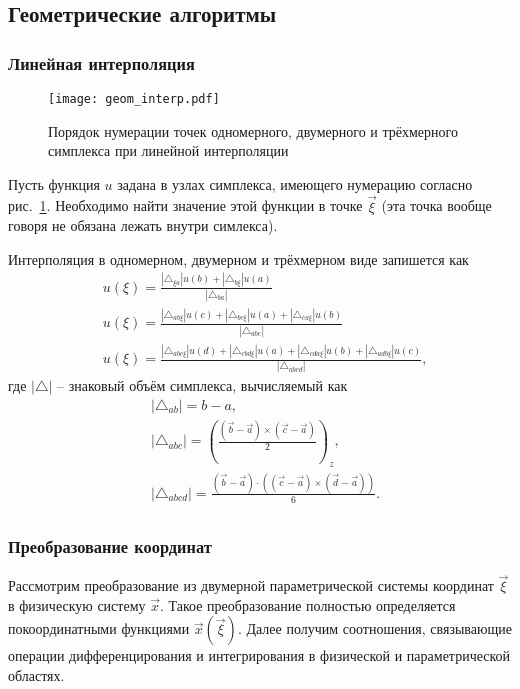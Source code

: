 \subsection{Геометрические алгоритмы}
\subsubsection{Линейная интерполяция}
\begin{figure}[h!]
\centering
\texttt{[image: geom\_interp.pdf]}
\caption{Порядок нумерации точек одномерного, двумерного и трёхмерного симплекса при линейной интерполяции}
\label{fig:geom_interp}
\end{figure}
Пусть функция $u$ задана в узлах симплекса, имеющего нумерацию согласно рис.~\ref{fig:geom_interp}.
Необходимо найти значение этой функции в точке $\vec \xi$ (эта точка вообще говоря не обязана лежать внутри симлекса).

Интерполяция в одномерном, двумерном и трёхмерном виде запишется как
\begin{align}
\label{eq:simplex_interp_1d}
&u(\xi) =
\frac{
|\triangle_{\xi a}|u(b)+
|\triangle_{b \xi}|u(a)
}
{|\triangle_{ba}|}
\\[10pt]
\label{eq:simplex_interp_2d}
&u(\xi) =
\frac{
|\triangle_{ab\xi}|u(c) +
|\triangle_{bc\xi}|u(a) +
|\triangle_{ca\xi}|u(b)
}
{|\triangle_{abc}|}
\\[10pt]
\label{eq:simplex_interp_3d}
&u(\xi) =
\frac{
|\triangle_{abc\xi}|u(d) +
|\triangle_{cbd\xi}|u(a) +
|\triangle_{cda\xi}|u(b) +
|\triangle_{adb\xi}|u(c)
}
{|\triangle_{abcd}|},
\end{align}
где $|\triangle|$ -- знаковый объём симплекса, вычисляемый как
\begin{align*}
& |\triangle_{ab}| = b - a, \\[10pt]
& |\triangle_{abc}| = \left(\frac{(\vec b - \vec a)\times(\vec c - \vec a)}{2}\right)_z, \\[10pt]
& |\triangle_{abcd}| = \frac{(\vec b - \vec a)\cdot\left((\vec c - \vec a)\times(\vec d - \vec a)\right)}{6}.\\[10pt]
\end{align*}

\subsubsection{Преобразование координат}
\label{sec:coo_transform} 
Рассмотрим преобразование
из двумерной параметрической системы координат $\vec \xi$ 
в физическую систему $\vec x$.
Такое преобразование полностью определяется покоординатными
функциями $\vec x(\vec \xi)$.
Далее получим соотношения, связывающие операции дифференцирования
и интегрирования в физической и параметрической областях.

